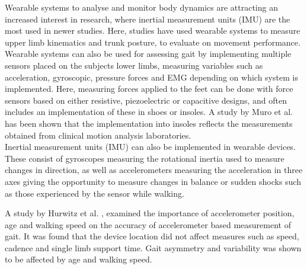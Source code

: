 Wearable systems to analyse and monitor body dynamics are attracting an increased interest in research, where inertial measurement units (IMU) are the most used in newer studies. Here, studies have used wearable systems to measure upper limb kinematics and trunk posture, to evaluate on movement performance. \cite{Wang2017} Wearable systems can also be used for assessing gait by implementing multiple sensors placed on the subjects lower limbs, measuring variables such as acceleration, gyroscopic, pressure forces and EMG depending on which system is implemented. Here, measuring forces applied to the feet can be done with force sensors based on either resistive, piezoelectric or capacitive designs, and often includes an implementation of these in shoes or insoles. \cite{Muro2014} A study by Muro et al. \cite{Muro2014} has been shown that the implementation into insoles reflects the measurements obtained from clinical motion analysis laboratories. \\
Inertial measurement units (IMU) can also be implemented in wearable devices. These consist of gyroscopes measuring the rotational inertia used to measure changes in direction, as well as accelerometers measuring the acceleration in three axes giving the opportunity to measure changes in balance or sudden shocks such as those experienced by the sensor while walking. \cite{Muro2014}

A study by Hurwitz et al. \cite{Hurwitz2016}, examined the importance of accelerometer position, age and walking speed on the accuracy of accelerometer based measurement of gait. It was found that the device location did not affect measures such as speed, cadence and single limb support time. Gait asymmetry and variability was shown to be affected by age and walking speed. 




